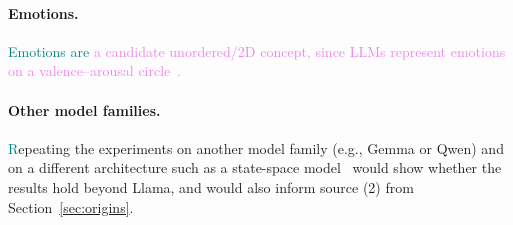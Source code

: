 \documentclass[11pt,a4paper]{article}
\newcommand{\fromold}[1]{\textcolor{violet}{#1}}
\newcommand{\fromclaude}[1]{\textcolor{orange!85!black}{#1}}
\newcommand{\fromprose}[1]{\textcolor{teal}{#1}}
\newcommand{\fromold}[1]{#1}
\newcommand{\fromclaude}[1]{#1}
\newcommand{\fromprose}[1]{#1}
\begin{document}
\paragraph{Emotions.}
\fromprose{Emotions are} \fromold{a candidate unordered/2D concept, since LLMs represent emotions on a valence--arousal circle~\cite{sun2026valence}.}

\paragraph{Other model families.}
\fromclaude{\fromprose{R}epeating the experiments on another model family (e.g., Gemma or Qwen) and on a different architecture such as a state-space model~\cite{gu2023mamba} would show whether the results hold beyond Llama, and would also inform source (2) from Section~\ref{sec:origins}.}

\printbibliography[heading=bibintoc,title={References}]
\end{document}
